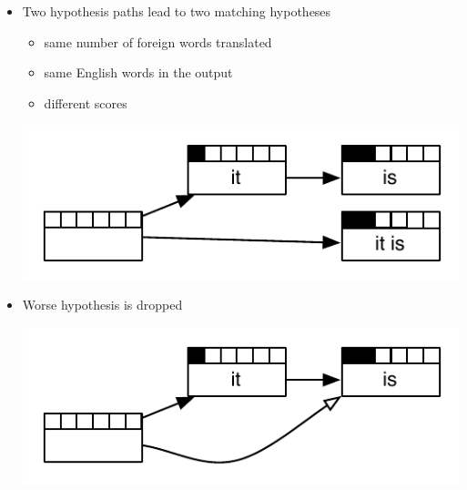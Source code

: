 \documentclass[landscape]{slides}
\begin{document}

\begin{itemize}
\item Two hypothesis paths lead to two matching hypotheses
\begin{itemize}
\item same number of foreign words translated
\item same English words in the output
\item different scores
\end{itemize}
\begin{center} \vspace{-10mm}
\includegraphics[scale=1.3]{recombination-example1.pdf}
\end{center}
\item  Worse hypothesis is dropped
\begin{center} \vspace{-5mm}
\includegraphics[scale=1.3]{recombination-example2.pdf}
\end{center}
\end{itemize}

\end{document}
